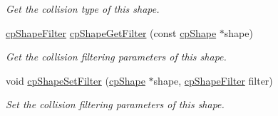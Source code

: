 \begin{DoxyCompactItemize}
\begin{DoxyCompactList}\small\item\em Get the collision type of this shape. \end{DoxyCompactList}\item 
\hypertarget{group__cp_shape_ga262e697de5ca5547b183d89a6728608f}{}\hyperlink{structcp_shape_filter}{cp\+Shape\+Filter} \hyperlink{group__cp_shape_ga262e697de5ca5547b183d89a6728608f}{cp\+Shape\+Get\+Filter} (const \hyperlink{structcp_shape}{cp\+Shape} $\ast$shape)\label{group__cp_shape_ga262e697de5ca5547b183d89a6728608f}

\begin{DoxyCompactList}\small\item\em Get the collision filtering parameters of this shape. \end{DoxyCompactList}\item 
\hypertarget{group__cp_shape_ga16b40c3808b0246b1b5e29693ee7db42}{}void \hyperlink{group__cp_shape_ga16b40c3808b0246b1b5e29693ee7db42}{cp\+Shape\+Set\+Filter} (\hyperlink{structcp_shape}{cp\+Shape} $\ast$shape, \hyperlink{structcp_shape_filter}{cp\+Shape\+Filter} filter)\label{group__cp_shape_ga16b40c3808b0246b1b5e29693ee7db42}

\begin{DoxyCompactList}\small\item\em Set the collision filtering parameters of this shape. \end{DoxyCompactList}\end{DoxyCompactItemize}
